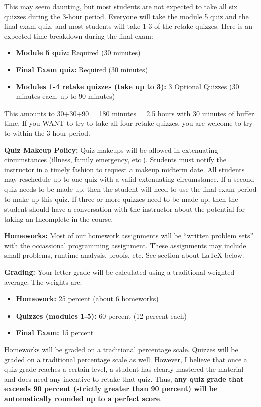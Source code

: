 \documentclass[12pt]{article}
\begin{document}
This may seem daunting, but most students are not expected to take all six quizzes during the 3-hour period. Everyone will take the module 5 quiz and the final exam quiz, and most students will take 1-3 of the retake quizzes. Here is an expected time breakdown during the final exam:

\begin{itemize}
\item  \textbf{Module 5 quiz:} Required (30 minutes)
\item  \textbf{Final Exam quiz:} Required (30 minutes)
\item  \textbf{Modules 1-4 retake quizzes (take up to 3):} 3 Optional Quizzes (30 minutes each, up to 90 minutes)
\end{itemize}

This amounts to 30+30+90 = 180 minutes = 2.5 hours with 30 minutes of buffer time. If you WANT to try to take all four retake quizzes, you are welcome to try to within the 3-hour period. 



\textbf{Quiz Makeup Policy:} Quiz makeups will be allowed in extenuating circumstances (illness, family emergency, etc.). Students must notify the instructor in a timely fashion to request a makeup midterm date. All students may reschedule up to one quiz with a valid extenuating circumstance. If a second quiz needs to be made up, then the student will need to use the final exam period to make up this quiz. If three or more quizzes need to be made up, then the student should have a conversation with the instructor about the potential for taking an Incomplete in the course. 

\textbf{Homeworks:} Most of our homework assignments will be ``written problem sets'' with the occassional programming assignment. These assignments may include small problems, runtime analysis, proofs, etc.   See section about \LaTeX{} below.

\textbf{Grading:} Your letter grade will be calculated using a traditional weighted average. The weights are:

\begin{itemize}
\item \textbf{Homework:} 25 percent (about 6 homeworks)
\item \textbf{Quizzes (modules 1-5):} 60 percent (12 percent each)
\item \textbf{Final Exam:} 15 percent
\end{itemize}

Homeworks will be graded on a traditional percentage scale. Quizzes will be graded on a traditional percentage scale as well. However, I believe that once a quiz grade reaches a certain level, a student has clearly mastered the material and does need any incentive to retake that quiz. Thus, \textbf{any quiz grade that exceeds 90 percent (strictly greater than 90 percent) will be automatically rounded up to a perfect score}.
\end{document}
